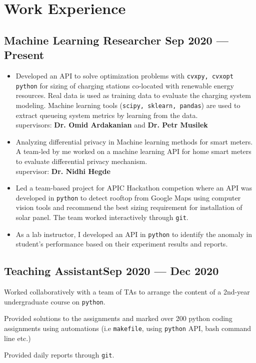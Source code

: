 \documentclass[letter,10pt]{article}
\begin{document}
\section{Work Experience}
\subsection{{Machine Learning Researcher \hfill Sep 2020 --- Present}}
\begin{itemize}
\item Developed an API to solve optimization problems with \texttt{cvxpy, cvxopt python} for sizing of charging stations co-located with renewable energy resources. Real data is used as training data to evaluate the charging system modeling. Machine learning tools (\texttt{scipy, sklearn, pandas}) are used to extract queueing system metrics by learning from  the data.\\
supervisors: \textbf{Dr. Omid Ardakanian} and \textbf{Dr. Petr Musilek}
\item Analyzing differential privacy in Machine learning methods for smart meters. A team-led by me worked on a machine learning API for home smart meters to evaluate differential privacy mechanism.\\
supervisor: \textbf{Dr. Nidhi Hegde}

\item Led a team-based project for APIC Hackathon competion where an API was developed in \texttt{python} to detect rooftop from Google Maps using computer vision tools and recommend the best sizing requirement for installation of solar panel. The team worked interactively through \texttt{git}.

\item As a lab instructor, I developed an API in \texttt{python} to identify the anomaly in student's performance based on their experiment results and reports. 
\end{itemize}

\subsection{{Teaching Assistant\hfill Sep 2020 --- Dec 2020}}
\begin{zitemize}
	\item Worked collaboratively with a team of TAs to arrange the content of a 2nd-year undergraduate course on \texttt{python}.
	\item Provided solutions to the assignments and marked over 200 python coding assignments using automations (i.e \texttt{makefile}, using \texttt{python} API, bash command line etc.)
	\item Provided daily reports through \texttt{git}.
\end{zitemize}
\end{document}
